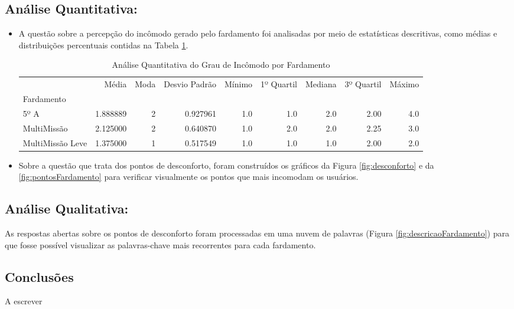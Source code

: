     \subsection{Análise Quantitativa:}
    \begin{itemize}
    \item A questão sobre a percepção do incômodo gerado pelo fardamento foi analisadas por meio de estatísticas descritivas, como médias e distribuições percentuais contidas na Tabela \ref{tab:analise_fardamento}.
    \begin{table}[H]
\centering
\caption{Análise Quantitativa do Grau de Incômodo por Fardamento}
\label{tab:analise_fardamento}
\footnotesize
\begin{tabular}{lrrrrrrrr}
\toprule
{} &     Média &  Moda &  Desvio Padrão &  Mínimo &  1º Quartil &  Mediana &  3º Quartil &  Máximo \\
Fardamento       &           &       &                &         &             &          &             &         \\
\midrule
5º A             &  1.888889 &     2 &       0.927961 &     1.0 &         1.0 &      2.0 &        2.00 &     4.0 \\
MultiMissão      &  2.125000 &     2 &       0.640870 &     1.0 &         2.0 &      2.0 &        2.25 &     3.0 \\
MultiMissão Leve &  1.375000 &     1 &       0.517549 &     1.0 &         1.0 &      1.0 &        2.00 &     2.0 \\
\bottomrule
\end{tabular}
\end{table}
    
       \item Sobre a questão que trata dos pontos de desconforto, foram construídos os gráficos da Figura \ref{fig:desconforto} %
       e da \ref{fig:pontosFardamento} para verificar visualmente os pontos que mais incomodam os usuários.
\end{itemize}



 
    \subsection{ Análise Qualitativa:}
    As respostas abertas sobre os pontos de desconforto foram processadas em uma nuvem de palavras (Figura \ref{fig:descricaoFardamento}) para que fosse possível visualizar as palavras-chave mais recorrentes para cada fardamento.

\subsection{Conclusões}
    A escrever
